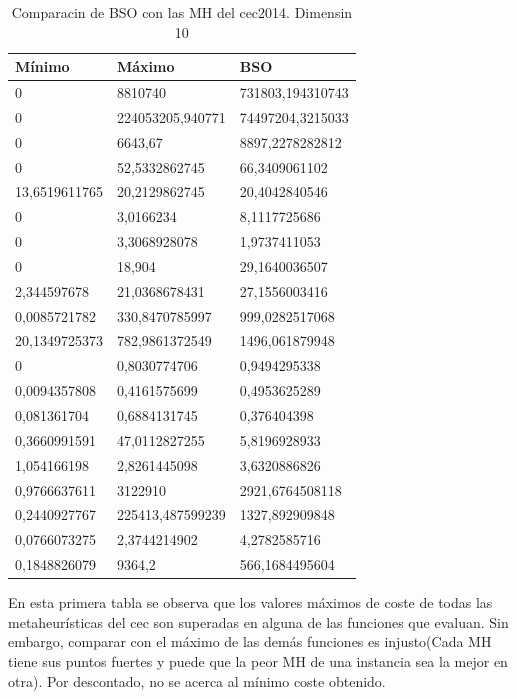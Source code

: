 \begin{table}[htbp]
	\begin{center}
		\begin{tabular}{|l|l|l|}
			\hline
			Mínimo & Máximo & BSO \\
			\hline \hline
			0 & 8810740 & 731803,194310743 \\ \hline
			0 & 224053205,940771 & 74497204,3215033 \\ \hline
			0 & 6643,67 & 8897,2278282812 \\ \hline
			0 & 52,5332862745 & 66,3409061102 \\ \hline
			13,6519611765 & 20,2129862745 & 20,4042840546\\ \hline
			0 & 3,0166234 & 8,1117725686\\ \hline
			0 & 3,3068928078 & 1,9737411053\\ \hline
			0 & 18,904 & 29,1640036507\\ \hline
			2,344597678 & 21,0368678431 & 27,1556003416\\ \hline
			0,0085721782 & 330,8470785997 & 999,0282517068\\ \hline
			20,1349725373 & 782,9861372549 & 1496,061879948\\ \hline
			0 & 0,8030774706 & 0,9494295338\\ \hline
			0,0094357808 & 0,4161575699 & 0,4953625289\\ \hline
			0,081361704 & 0,6884131745 & 0,376404398\\ \hline
			0,3660991591 & 47,0112827255 & 5,8196928933\\ \hline
			1,054166198 & 2,8261445098 & 3,6320886826\\ \hline
			0,9766637611 & 3122910 & 2921,6764508118\\ \hline
			0,2440927767 & 225413,487599239 & 1327,892909848\\ \hline
			0,0766073275 & 2,3744214902 & 4,2782585716\\ \hline
			0,1848826079 & 9364,2 & 566,1684495604\\ \hline


		\end{tabular}
		\caption{Comparacin de BSO con las MH del cec2014. Dimensin 10}
		\label{tabla:Dimension10Comparativa}
	\end{center}
\end{table}

En esta primera tabla se observa que los valores máximos de coste de todas las metaheurísticas del cec son superadas en alguna de las funciones que evaluan. Sin embargo, comparar con el máximo de las demás funciones es injusto(Cada MH tiene sus puntos fuertes y puede que la peor MH de una instancia sea la mejor en otra). Por descontado, no se acerca al mínimo coste obtenido.\\

